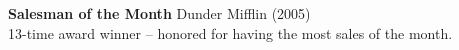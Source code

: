 \textbf{Salesman of the Month} \hfill Dunder Mifflin (2005)\\
13-time award winner – honored for having the most sales of the month.\\
\vspace*{2mm}